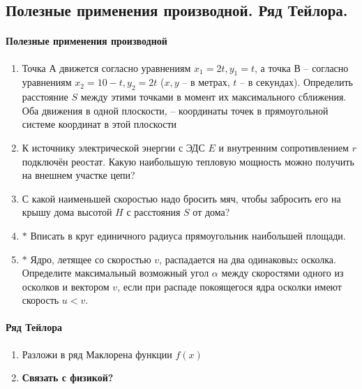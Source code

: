\subsection*{Полезные применения производной. Ряд Тейлора.}
\paragraph{Полезные применения производной}
\begin{enumerate}
    \item Точка А движется согласно уравнениям $x_1 = 2t, y_1 = t$, а точка В – согласно уравнениям $x_2 = 10-t, y_2 = 2t$ ($x, y$ – в метрах, $t$ – в секундах). Определить расстояние $S$ между этими точками в момент их максимального сближения. Оба движения в одной плоскости,  – координаты точек в прямоугольной системе координат в этой плоскости
    \item К источнику электрической энергии с ЭДС $E$ и внутренним сопротивлением $r$ подключён реостат. Какую наибольшую тепловую мощность можно получить на внешнем участке цепи?
    \item С какой наименьшей скоростью надо бросить мяч, чтобы забросить его на крышу дома высотой $H$ с расстояния $S$ от дома?
    \item $\boldsymbol{*}$ Вписать в круг единичного радиуса прямоугольник наибольшей площади.
    \item $\boldsymbol{*}$ Ядро, летящее со скоростью $v$, распадается на два одинаковыx осколка. Определите максимальный возможный угол $\alpha$ между скоростями одного из осколков и вектором $v$, если при распаде покоящегося ядра осколки имеют скорость $u<v$.
\end{enumerate}
\paragraph{Ряд Тейлора}
\begin{enumerate}
    \item Разложи в ряд Маклорена функции $f(x)$
    \item \textbf{Связать с физикой?}
\end{enumerate}